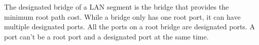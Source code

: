 The designated bridge of a LAN segment is the bridge that provides the minimum root path cost. While a bridge only has one root port, it can have multiple designated ports. All the ports on a root bridge are designated ports. A port can't be a root port and a designated port at the same time.